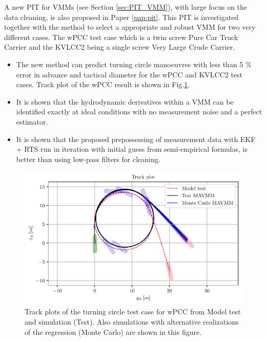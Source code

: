 \noindent A new PIT for VMMs (see Section \ref{sec:PIT_VMM}), with large focus on the data cleaning, is also proposed in Paper \ref{pap:pit}. This PIT is investigated together with the method to select a appropriate and robust VMM for two very different cases. The wPCC test case which is a twin screw Pure Car Truck Carrier and the KVLCC2 being a single screw Very Large Crude Carrier.    
\begin{itemize}
    \item The new method can predict turning circle manoeuvres with less than 5 \% error in advance and tactical diameter for the wPCC and KVLCC2 test cases. Track plot of the wPCC result is shown in Fig.\ref{fig:turning_circle_wpcc}.
    
    \item It is shown that the hydrodynamic derivatives within a VMM can be identified exactly at ideal conditions with no measurement noise and a perfect estimator.
    
    \item It is shown that the proposed prepossessing of measurement data with EKF + RTS run in iteration with initial guess from semi-empirical formulas, is better than using low-pass filters for cleaning.
    
\end{itemize}

\begin{figure}[H]
    \centering
    \includegraphics{kappa/images/10.pdf}
    \caption{Track plots of the turning circle test case for wPCC from Model test and simulation (Test). Also simulations with alternative realizations of the regression (Monte Carlo) are shown in this figure.}
    \label{fig:turning_circle_wpcc}
\end{figure}




